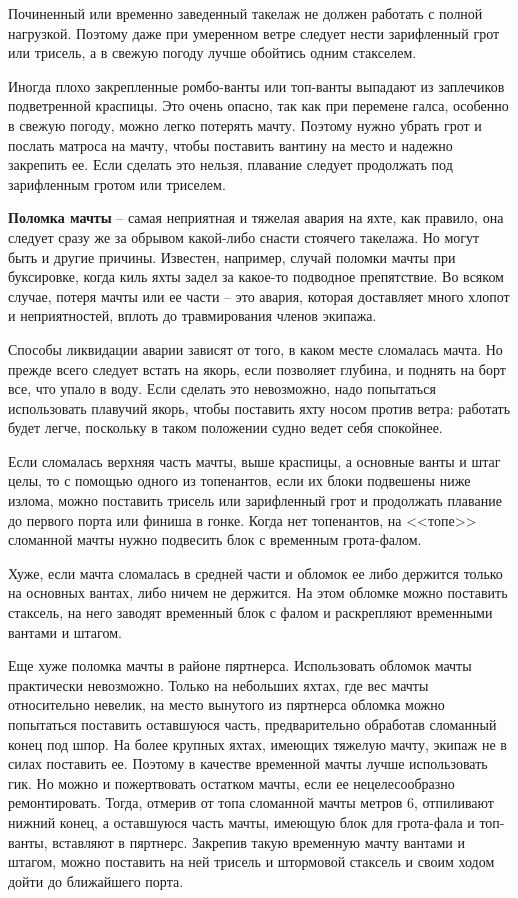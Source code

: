\documentclass[a4paper, 12pt, twoside, final]{scrbook}
\begin{document}
Починенный или временно заведенный такелаж не должен работать с полной нагрузкой. Поэтому даже при умеренном ветре следует нести зарифленный грот или трисель, а в свежую погоду лучше обойтись одним стакселем.

Иногда плохо закрепленные ромбо-ванты или топ-ванты выпадают из заплечиков подветренной краспицы. Это очень опасно, так как при перемене галса, особенно в свежую погоду, можно легко потерять мачту. Поэтому нужно убрать грот и послать матроса на мачту, чтобы поставить вантину на место и надежно закрепить ее. Если сделать это нельзя, плавание следует продолжать под зарифленным гротом или триселем.

\textbf{Поломка мачты} \--- самая неприятная и тяжелая авария на яхте, как правило, она следует сразу же за обрывом какой-либо снасти стоячего такелажа. Но могут быть и другие причины. Известен, например, случай поломки мачты при буксировке, когда киль яхты задел за какое-то подводное препятствие. Во всяком случае, потеря мачты или ее части \--- это авария, которая доставляет много хлопот и неприятностей, вплоть до травмирования членов экипажа.

Способы ликвидации аварии зависят от того, в каком месте сломалась мачта. Но прежде всего следует встать на якорь, если позволяет глубина, и поднять на борт все, что упало в воду. Если сделать это невозможно, надо попытаться использовать плавучий якорь, чтобы поставить яхту носом против ветра: работать будет легче, поскольку в таком положении судно ведет себя спокойнее.

Если сломалась верхняя часть мачты, выше краспицы, а основные ванты и штаг целы, то с помощью одного из топенантов, если их блоки подвешены ниже излома, можно поставить трисель или зарифленный грот и продолжать плавание до первого порта или финиша в гонке. Когда нет топенантов, на <<топе>> сломанной мачты нужно подвесить блок с временным грота-фалом.

Хуже, если мачта сломалась в средней части и обломок ее либо держится только на основных вантах, либо ничем не держится. На этом обломке можно поставить стаксель, на него заводят временный блок с фалом и раскрепляют временными вантами и штагом.

Еще хуже поломка мачты в районе пяртнерса. Использовать обломок мачты практически невозможно. Только на небольших яхтах, где вес мачты относительно невелик, на место вынутого из пяртнерса обломка можно попытаться поставить оставшуюся часть, предварительно обработав сломанный конец под шпор. На более крупных яхтах, имеющих тяжелую мачту, экипаж не в силах поставить ее. Поэтому в качестве временной мачты лучше использовать гик. Но можно и пожертвовать остатком мачты, если ее нецелесообразно ремонтировать. Тогда, отмерив от топа сломанной мачты метров 6, отпиливают нижний конец, а оставшуюся часть мачты, имеющую блок для грота-фала и топ-ванты, вставляют в пяртнерс. Закрепив такую временную мачту вантами и штагом, можно поставить на ней трисель и штормовой стаксель и своим ходом дойти до ближайшего порта.
\end{document}
